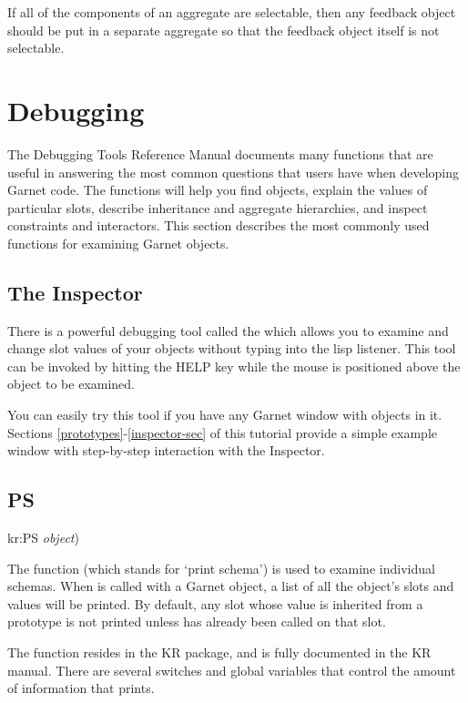If all of the components of an aggregate are selectable, then any
feedback object should be put in a separate aggregate so that the
feedback object itself is not selectable.


\chapter{Debugging}

The Debugging Tools Reference Manual documents many functions that are
useful in answering the most common questions that users have when
developing Garnet code.  The functions will help you find objects, explain
the values of particular slots, describe inheritance and aggregate
hierarchies, and inspect constraints and interactors.  This section
describes the most commonly used functions for examining Garnet objects.


\section{The Inspector}

There is a powerful debugging tool called the  which allows
you to examine and change slot values of your objects without typing into the
lisp listener.  This tool can be invoked by hitting the HELP key while the
mouse is positioned above the object to be examined.

You can easily try this tool if you have any Garnet window with objects in it.
Sections \ref{prototypes}-\ref{inspector-sec} of this tutorial provide a
simple example window with step-by-step interaction with the Inspector.


\section{PS}

\begin{programexample}
kr:PS {\it object})
\end{programexample}

The function  (which stands for `print schema') is used to examine
individual schemas.  When  is called with a Garnet object, a list
of all the object's slots and values will be printed.  By default, any slot
whose value is inherited from a prototype is not printed unless 
has already been called on that slot.

The  function resides in the KR package, and is fully documented
in the KR manual.  There are several switches and global variables that
control the amount of information that  prints.


